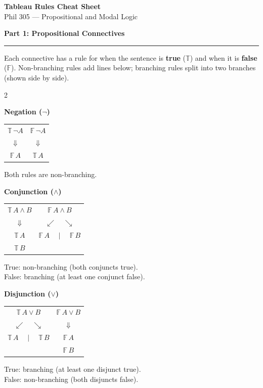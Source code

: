 \documentclass[10pt]{article}
\newcommand{\T}{\mathbb{T}}
\newcommand{\F}{\mathbb{F}}
\newcommand{\ruleheader}[1]{\medskip\noindent\textbf{\large #1}\par\smallskip\hrule\smallskip}
\newcommand{\rulesubheader}[1]{\smallskip\noindent\textbf{#1}\par\smallskip}
\begin{document}
\begin{center}
{\LARGE\bfseries Tableau Rules Cheat Sheet}\\[4pt]
{\large Phil 305 --- Propositional and Modal Logic}
\end{center}

\ruleheader{Part 1: Propositional Connectives}

Each connective has a rule for when the sentence is \textbf{true} ($\T$) and when it is \textbf{false} ($\F$). Non-branching rules add lines below; branching rules split into two branches (shown side by side).

\begin{multicols}{2}

\rulesubheader{Negation ($\neg$)}

\begin{tabular}{@{}c@{\qquad\qquad}c@{}}
$\T\, \neg A$ & $\F\, \neg A$ \\[2pt]
$\Downarrow$ & $\Downarrow$ \\[2pt]
$\F\, A$ & $\T\, A$
\end{tabular}

\smallskip
Both rules are non-branching.

\rulesubheader{Conjunction ($\wedge$)}

\begin{tabular}{@{}c@{\qquad\qquad}c@{}}
$\T\, A \wedge B$ & $\F\, A \wedge B$ \\[2pt]
$\Downarrow$ & $\swarrow\quad\searrow$ \\[2pt]
$\T\, A$ & $\F\, A \quad\mid\quad \F\, B$ \\
$\T\, B$ &
\end{tabular}

\smallskip
True: non-branching (both conjuncts true).\\
False: branching (at least one conjunct false).

\columnbreak

\rulesubheader{Disjunction ($\vee$)}

\begin{tabular}{@{}c@{\qquad\qquad}c@{}}
$\T\, A \vee B$ & $\F\, A \vee B$ \\[2pt]
$\swarrow\quad\searrow$ & $\Downarrow$ \\[2pt]
$\T\, A \quad\mid\quad \T\, B$ & $\F\, A$ \\
 & $\F\, B$
\end{tabular}

\smallskip
True: branching (at least one disjunct true).\\
False: non-branching (both disjuncts false).


\end{multicols}
\end{document}
